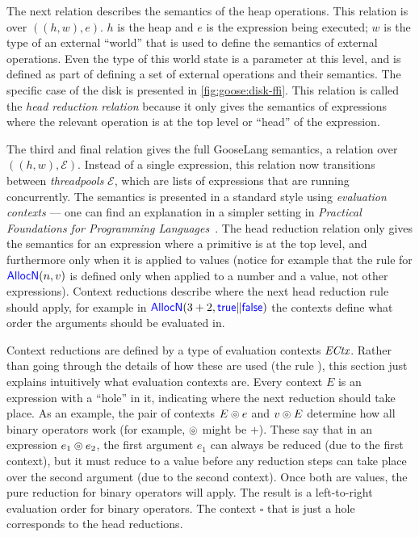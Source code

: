 The next relation describes the semantics of the heap operations. This relation is over
$((h, w), e)$. $h$ is the heap and $e$ is the expression being executed; $w$ is
the type of an external ``world'' that is used to define the semantics of
external operations. Even the type of this world state is a parameter at this
level, and is defined as part of defining a set of external operations and their
semantics. The specific case of the disk is presented in
\cref{fig:goose:disk-ffi}. This
relation is called the \emph{head reduction
relation} because it only gives the semantics of expressions where the
relevant operation is at the top level or ``head'' of the expression.

The third and final relation gives the full GooseLang semantics, a relation over
$((h, w), \mathcal{E})$. Instead of a
single expression, this relation now transitions between \emph{threadpools} $\mathcal{E}$,
which are lists of expressions that are
running concurrently. The semantics is presented in a standard style using
\emph{evaluation contexts} --- one can find an explanation in a simpler setting
in \emph{Practical Foundations for Programming Languages}~\cite[\S
5.3]{harper:pfpl}. The head reduction relation only gives the semantics for an
expression where a primitive is at the top level, and furthermore only when it is
applied to values (notice for example that the rule for $\mathsf{\textcolor{blue}{AllocN}}(n, v)$
is defined only when applied to a number and a value, not other expressions).
Context reductions describe where the next head reduction rule should apply, for
example in $\mathsf{\textcolor{blue}{AllocN}}(3+2, \mathsf{\textcolor{blue}{true}} \| \mathsf{\textcolor{blue}{false}})$ the contexts
define what order the arguments should be evaluated in.

Context reductions are defined by a type of evaluation contexts
$\textit{ECtx}$. Rather than going through the details of how these are used
(the rule ), this section just explains intuitively what
evaluation contexts are. Every context $E$ is an expression with a ``hole'' in
it, indicating where the next reduction should take place. As an example, the pair of contexts $E \circledcirc e$ and
$v \circledcirc E$ determine how all binary operators work (for example, $\circledcirc$
might be $+$). These say that in an expression $e_{1} \circledcirc e_{2}$, the first argument
$e_{1}$ can always be reduced (due to the first context), but it must reduce
to a value before any reduction steps can take place over the second argument (due to
the second context). Once both are values, the pure reduction for binary
operators will apply. The result is a left-to-right evaluation order for binary
operators. The context $\square$ that is just a hole corresponds to the head reductions.

